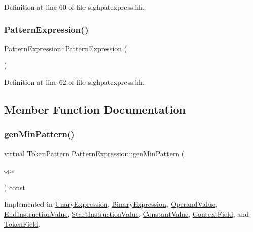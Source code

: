 Definition at line 60 of file slghpatexpress.\+hh.

\mbox{\label{class_pattern_expression_abbb0f85fbbbaf66e5638356bcca53bc8}} 
\subsubsection{\texorpdfstring{PatternExpression()}{PatternExpression()}}
{\footnotesize\ttfamily Pattern\+Expression\+::\+Pattern\+Expression (\begin{DoxyParamCaption}\item[{void}]{ }\end{DoxyParamCaption})\hspace{0.3cm}{\ttfamily [inline]}}



Definition at line 62 of file slghpatexpress.\+hh.



\subsection{Member Function Documentation}
\mbox{\label{class_pattern_expression_a1dc2d0c07f64fdab9da6c0849e992b50}} 
\subsubsection{\texorpdfstring{genMinPattern()}{genMinPattern()}}
{\footnotesize\ttfamily virtual \mbox{\hyperlink{class_token_pattern}{Token\+Pattern}} Pattern\+Expression\+::gen\+Min\+Pattern (\begin{DoxyParamCaption}\item[{const vector$<$ \mbox{\hyperlink{class_token_pattern}{Token\+Pattern}} $>$ \&}]{ops }\end{DoxyParamCaption}) const\hspace{0.3cm}{\ttfamily [pure virtual]}}



Implemented in \mbox{\hyperlink{class_unary_expression_a007556c4977ab285520e4555a71ea8de}{Unary\+Expression}}, \mbox{\hyperlink{class_binary_expression_a840abb5f9741368ab019495a2b4c5dbf}{Binary\+Expression}}, \mbox{\hyperlink{class_operand_value_ad483d53c77f85d1042bbb05749c07a20}{Operand\+Value}}, \mbox{\hyperlink{class_end_instruction_value_a268e8aae070151119c5b253522d35b0e}{End\+Instruction\+Value}}, \mbox{\hyperlink{class_start_instruction_value_afb0f9fba5d65119bdd04e4507630f77f}{Start\+Instruction\+Value}}, \mbox{\hyperlink{class_constant_value_a8193ec263bd8e0ae1b736d7ae3cad291}{Constant\+Value}}, \mbox{\hyperlink{class_context_field_a715c15711f5b53e64694b654060e3257}{Context\+Field}}, and \mbox{\hyperlink{class_token_field_a9ad83c4d71dbd0f22c12f670cb07c11c}{Token\+Field}}.

